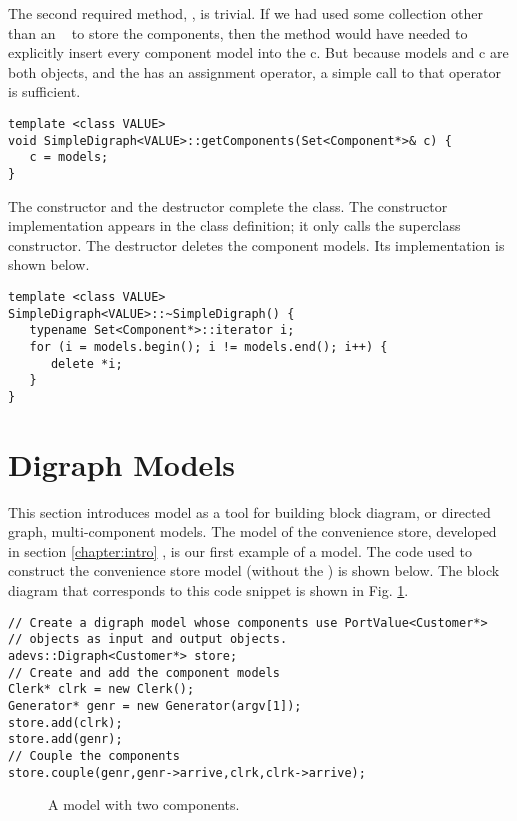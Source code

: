 The second required method, , is trivial. If we had used some collection other than an \adevs\  to store the components, then the method would have needed to explicitly insert every component model into the  c. But because models and c are both  objects, and the  has an assignment operator, a simple call to that operator is sufficient.
\begin{verbatim}
template <class VALUE>
void SimpleDigraph<VALUE>::getComponents(Set<Component*>& c) {
   c = models;
}
\end{verbatim}

The constructor and the destructor complete the class. The constructor implementation appears in the class definition; it only calls the superclass constructor. The destructor deletes the component models. Its implementation is shown below.
\begin{verbatim}
template <class VALUE>
SimpleDigraph<VALUE>::~SimpleDigraph() {
   typename Set<Component*>::iterator i;
   for (i = models.begin(); i != models.end(); i++) {
      delete *i;
   }
}
\end{verbatim}
 
\section{Digraph Models}
\label{section:digraph_models}
This
section introduces  model as a tool for building block diagram, or directed graph, multi-component
models. The model of the convenience store, developed in section \ref{chapter:intro}
, is our first example of a  model.
The code used to construct the convenience store model (without the ) is shown
below. The block diagram that corresponds to this code snippet is shown in Fig. \ref{fig:two_component_diagram}.
\begin{verbatim}
// Create a digraph model whose components use PortValue<Customer*>
// objects as input and output objects.
adevs::Digraph<Customer*> store;
// Create and add the component models
Clerk* clrk = new Clerk();
Generator* genr = new Generator(argv[1]);
store.add(clrk);
store.add(genr);
// Couple the components
store.couple(genr,genr->arrive,clrk,clrk->arrive);
\end{verbatim}
\begin{figure}[ht]
\centering
{}
\caption{A  model with two components.}
\label{fig:two_component_diagram}
\end{figure}

